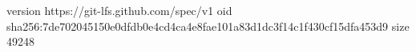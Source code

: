 version https://git-lfs.github.com/spec/v1
oid sha256:7de702045150e0dfdb0e4cd4ca4e8fae101a83d1dc3f14c1f430cf15dfa453d9
size 49248
